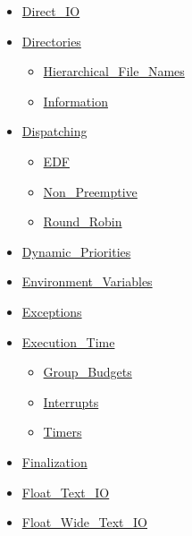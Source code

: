 \documentclass[english]{article}
\begin{document}
\begin{scriptsize}
\begin{multicols*}{5}
\begin{itemize}[leftmargin=0mm]
\begin{itemize}[leftmargin=5mm]
  \item[] \href{http://www.ada-auth.org/standards/22rm/html/RM-A-8-4.html}{Direct\_IO}
  \item[] \href{http://www.ada-auth.org/standards/22rm/html/RM-A-16.html}{Directories}
	\begin{itemize}[leftmargin=5mm]
	\item[] \href{http://www.ada-auth.org/standards/22rm/html/RM-A-16-1.html}{Hierarchical\_File\_Names}
	\item[] \href{http://www.ada-auth.org/standards/22rm/html/RM-A-16.html}{Information}
	\end{itemize}
  \item[] \href{http://www.ada-auth.org/standards/22rm/html/RM-D-2-1.html}{Dispatching}
	\begin{itemize}[leftmargin=5mm]
	\item[] \href{http://www.ada-auth.org/standards/22rm/html/RM-D-2-6.html}{EDF}
	\item[] \href{http://www.ada-auth.org/standards/22rm/html/RM-D-2-4.html}{Non\_Preemptive}
	\item[] \href{http://www.ada-auth.org/standards/22rm/html/RM-D-2-5.html}{Round\_Robin}
	\end{itemize}
  \item[] \href{http://www.ada-auth.org/standards/22rm/html/RM-D-5-1.html}{Dynamic\_Priorities}
  \item[] \href{http://www.ada-auth.org/standards/22rm/html/RM-A-17.html}{Environment\_Variables}
  \item[] \href{http://www.ada-auth.org/standards/22rm/html/RM-11-4-1.html}{Exceptions}
  \item[] \href{http://www.ada-auth.org/standards/22rm/html/RM-D-14.html}{Execution\_Time}
	\begin{itemize}[leftmargin=5mm]
	\item[] \href{http://www.ada-auth.org/standards/22rm/html/RM-D-14-2.html}{Group\_Budgets}
	\item[] \href{http://www.ada-auth.org/standards/22rm/html/RM-D-14-3.html}{Interrupts}
	\item[] \href{http://www.ada-auth.org/standards/22rm/html/RM-D-14-1.html}{Timers}
	\end{itemize}
  \item[] \href{http://www.ada-auth.org/standards/22rm/html/RM-7-6.html}{Finalization}
  \item[] \href{http://www.ada-auth.org/standards/22rm/html/RM-A-10-9.html}{Float\_Text\_IO}
  \item[] \href{http://www.ada-auth.org/standards/22rm/html/RM-A-11.html}{Float\_Wide\_Text\_IO}

\end{itemize}
\end{itemize}
\end{multicols*}
\end{scriptsize}
\end{document}
